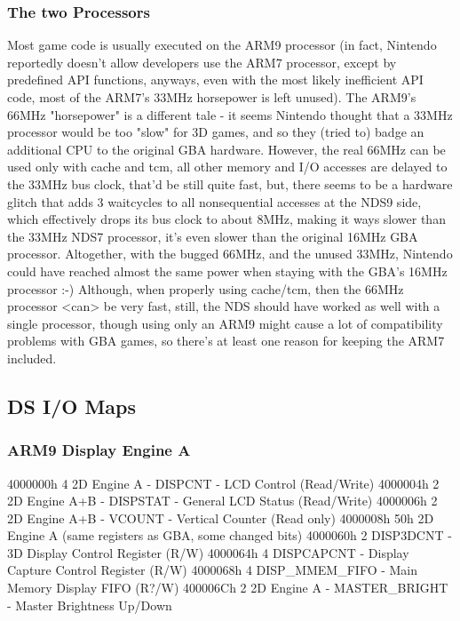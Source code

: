 \documentclass[11pt,a4paper]{proc}
\begin{document}
\begin{flushleft}
\subsubsection{The two Processors}
Most game code is usually executed on the ARM9 processor (in fact, Nintendo reportedly doesn't allow developers use the ARM7 processor, except by predefined API functions, anyways, even with the most likely inefficient API code, most of the ARM7's 33MHz horsepower is left unused).
The ARM9's 66MHz "horsepower" is a different tale - it seems Nintendo thought that a 33MHz processor would be too "slow" for 3D games, and so they (tried to) badge an additional CPU to the original GBA hardware.
However, the real 66MHz can be used only with cache and tcm, all other memory and I/O accesses are delayed to the 33MHz bus clock, that'd be still quite fast, but, there seems to be a hardware glitch that adds 3 waitcycles to all nonsequential accesses at the NDS9 side, which effectively drops its bus clock to about 8MHz, making it ways slower than the 33MHz NDS7 processor, it's even slower than the original 16MHz GBA processor.
Altogether, with the bugged 66MHz, and the unused 33MHz, Nintendo could have reached almost the same power when staying with the GBA's 16MHz processor :-)
Although, when properly using cache/tcm, then the 66MHz processor <can> be very fast, still, the NDS should have worked as well with a single processor, though using only an ARM9 might cause a lot of compatibility problems with GBA games, so there's at least one reason for keeping the ARM7 included.

\subsection{DS I/O Maps}
\subsubsection{ARM9 Display Engine A}

  4000000h  4    2D Engine A - DISPCNT - LCD Control (Read/Write)
  4000004h  2    2D Engine A+B - DISPSTAT - General LCD Status (Read/Write)
  4000006h  2    2D Engine A+B - VCOUNT - Vertical Counter (Read only)
  4000008h  50h  2D Engine A (same registers as GBA, some changed bits)
  4000060h  2    DISP3DCNT - 3D Display Control Register (R/W)
  4000064h  4    DISPCAPCNT - Display Capture Control Register (R/W)
  4000068h  4    DISP\_MMEM\_FIFO - Main Memory Display FIFO (R?/W)
  400006Ch  2    2D Engine A - MASTER\_BRIGHT - Master Brightness Up/Down


\end{flushleft}
\end{document}
